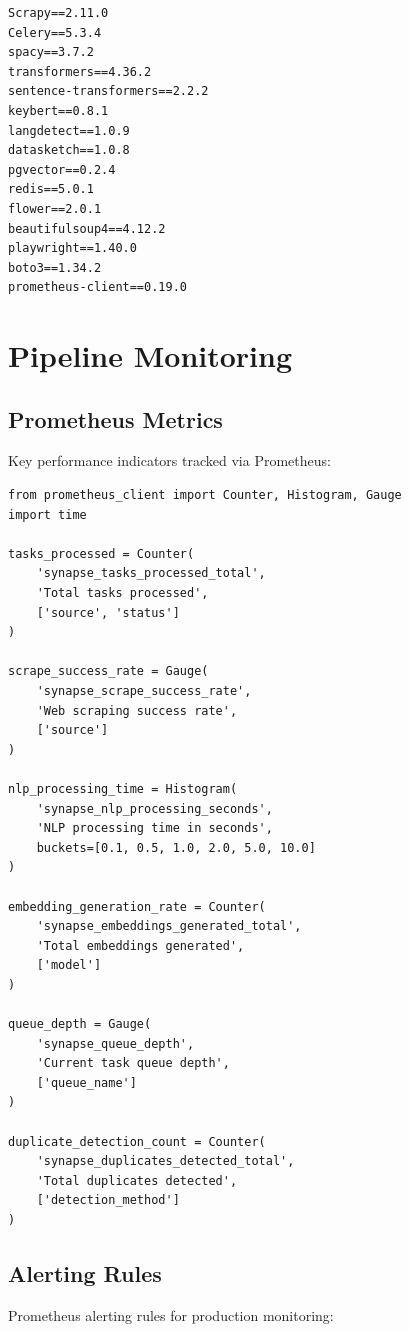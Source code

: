\documentclass[12pt,a4paper]{report}
\begin{document}
\begin{lstlisting}
Scrapy==2.11.0
Celery==5.3.4
spacy==3.7.2
transformers==4.36.2
sentence-transformers==2.2.2
keybert==0.8.1
langdetect==1.0.9
datasketch==1.0.8
pgvector==0.2.4
redis==5.0.1
flower==2.0.1
beautifulsoup4==4.12.2
playwright==1.40.0
boto3==1.34.2
prometheus-client==0.19.0
\end{lstlisting}

\chapter{Pipeline Monitoring}

\section{Prometheus Metrics}

Key performance indicators tracked via Prometheus:

\begin{lstlisting}
from prometheus_client import Counter, Histogram, Gauge
import time

tasks_processed = Counter(
    'synapse_tasks_processed_total',
    'Total tasks processed',
    ['source', 'status']
)

scrape_success_rate = Gauge(
    'synapse_scrape_success_rate',
    'Web scraping success rate',
    ['source']
)

nlp_processing_time = Histogram(
    'synapse_nlp_processing_seconds',
    'NLP processing time in seconds',
    buckets=[0.1, 0.5, 1.0, 2.0, 5.0, 10.0]
)

embedding_generation_rate = Counter(
    'synapse_embeddings_generated_total',
    'Total embeddings generated',
    ['model']
)

queue_depth = Gauge(
    'synapse_queue_depth',
    'Current task queue depth',
    ['queue_name']
)

duplicate_detection_count = Counter(
    'synapse_duplicates_detected_total',
    'Total duplicates detected',
    ['detection_method']
)
\end{lstlisting}

\section{Alerting Rules}

Prometheus alerting rules for production monitoring:
\end{document}
